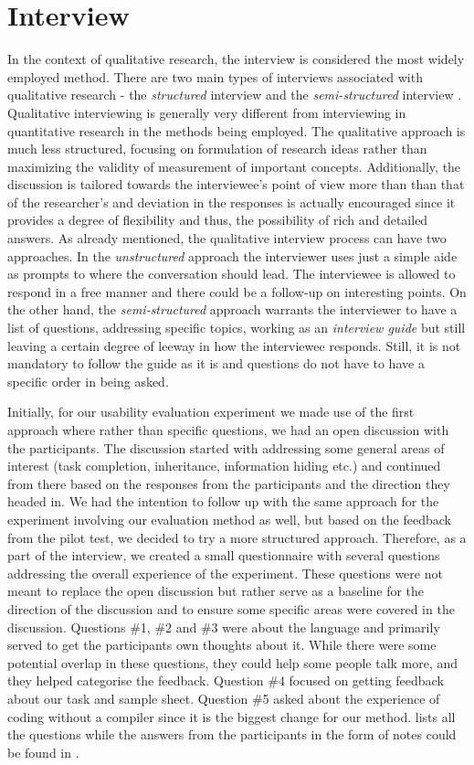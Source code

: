 \section{Interview}

In the context of qualitative research, the interview is considered the most widely employed method. There are two main types of interviews associated with qualitative research - the \textit{structured} interview and the \textit{semi-structured} interview \cite{Bryman}. Qualitative interviewing is generally very different from  interviewing in quantitative research in the methods being employed. The qualitative approach is much less structured, focusing on formulation of research ideas rather than maximizing the validity of measurement of important concepts. Additionally, the discussion is tailored towards the interviewee's point of view more than than that of the researcher's and deviation in the responses is actually encouraged since it provides a degree of flexibility and thus, the possibility of rich and detailed answers. As already mentioned, the qualitative interview process can have two approaches. In the \textit{unstructured} approach the interviewer uses just a simple aide as prompts to where the conversation should lead. The interviewee is allowed to respond in a free manner and there could be a follow-up on interesting points. On the other hand, the \textit{semi-structured} approach warrants the interviewer to have a list of questions, addressing specific topics, working as an \textit{interview guide} but still leaving a certain degree of leeway in how the interviewee responds. Still, it is not mandatory to follow the guide as it is and questions do not have to have a specific order in being asked. 

Initially, for our usability evaluation experiment we made use of the first approach where rather than specific questions, we had an open discussion with the participants. The discussion started with addressing some general areas of interest (task completion, inheritance, information hiding etc.) and continued from there based on the responses from the participants and the direction they headed in. We had the intention to follow up with the same approach for the experiment involving our evaluation method as well, but based on the feedback from the pilot test, we decided to try a more structured approach. 
Therefore, as a part of the interview, we created a small questionnaire with several questions addressing the overall experience of the experiment.
These questions were not meant to replace the open discussion but rather serve as a baseline for the direction of the discussion and to ensure some specific areas were covered in the discussion.
Questions \#1, \#2 and \#3 were about the language and primarily served to get the participants own thoughts about it.
While there were some potential overlap in these questions, they could help some people talk more, and they helped categorise the feedback.
Question \#4 focused on getting feedback about our task and sample sheet.
Question \#5 asked about the experience of coding without a compiler since it is the biggest change for our method.
 lists all the questions while the answers from the participants in the form of notes could be found in .
